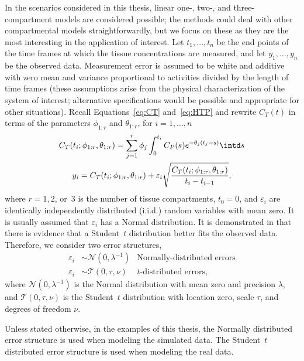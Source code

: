 In the scenarios considered in this thesis, linear one-, two-, and
three-compartment models are considered possible; the methods could deal with
other compartmental models straightforwardly, but we focus on these as they
are the most interesting in the application of interest. Let $t_1, \dots,
t_n$ be the end points of the time frames at which the tissue concentrations
are measured, and let $y_1,\dots,y_n$ be the observed data. Measurement error
is assumed to be white and additive with zero mean and variance proportional
to activities divided by the length of time frames (these assumptions arise
from the physical characterization of the \pet system of interest;
alternative specifications would be possible and appropriate for other
situations). Recall Equations~\eqref{eq:CT} and~\eqref{eq:HTP} and rewrite
$C_T(t)$ in terms of the parameters $\phi_{1:r}$ and $\theta_{1:r}$, for $i =
1,\dots,n$
\begin{gather*}
  C_T(t_i;\phi_{1:r},\theta_{1:r}) =
  \sum_{j=1}^r \phi_j\int_0^{t_i}C_P(s)e^{-\theta_j(t_j-s)} \intd s \\
  y_i = C_T(t_i;\phi_{1:r},\theta_{1:r}) +
  \varepsilon_i\sqrt{\frac{C_T(t_i;\phi_{1:r},\theta_{1:r})} {t_i - t_{i-1}}},
\end{gather*}
where $r = 1, 2$, or~$3$ is the number of tissue compartments, $t_0 = 0$, and
$\varepsilon_i$ are identically independently distributed (i.i.d.) random
variables with mean zero. It is usually assumed that $\varepsilon_i$ has a
Normal distribution. It is demonstrated in \cite{Zhou2013} that there is
evidence that a Student~$t$ distribution better fits the observed data.
Therefore, we consider two error structures,
\begin{align*}
  \varepsilon_i &\sim \mathcal{N}(0,\lambda^{-1})
  &\text{Normally-distributed errors} \\
  \varepsilon_i &\sim \mathcal{T}(0,\tau,\nu)
  &\text{$t$-distributed errors},
\end{align*}
where $\mathcal{N}(0,\lambda^{-1})$ is the Normal distribution with mean zero
and precision $\lambda$, and $\mathcal{T}(0,\tau,\nu)$ is the Student~$t$
distribution with location zero, scale $\tau$, and degrees of freedom $\nu$.

Unless stated otherwise, in the examples of this thesis, the Normally
distributed error structure is used when modeling the simulated data. The
Student~$t$ distributed error structure is used when modeling the real data.
